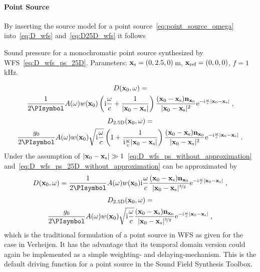 \paragraph{Point Source}
%
%
By inserting the source model for a point
source~\eqref{eq:point_source_omega}
into~\eqref{eq:D_wfs} and~\eqref{eq:D25D_wfs} it follows
%
\begin{marginfigure}
    \centering
    \ft
    
    \caption{Sound pressure for a monochromatic point source synthesized by
        \twohalfD \ac{WFS}~\eqref{eq:D_wfs_ps_25D}. Parameters: $\mathbf{x}_\text{s} = (0,2.5,0)$\,m,
        $\mathbf{x}_\text{ref} = (0,0,0)$, $f = 1$\,kHz.
        }
\end{marginfigure}
%
\begin{multline}
    D(\x_0,\omega) = \\
    \frac{1}{2\PI} A(\omega) w(\x_0) \left(\I\omegac +
    \frac{1}{|\x_0-\xs|} \right) \frac{(\x_0-\xs)\n_{\x_0}}{|\x_0-\xs|^2}
    \E^{-\I\omegac |\x_0-\xs|} \qc
    \label{eq:D_wfs_ps_without_approximation}
\end{multline}
%
\begin{multline}
    D_\twohalfD(\x_0,\omega) = \\
    \frac{g_0}{2\PI} A(\omega) w(\x_0) \sqrt{\I\omegac} \left(
    1 + \frac{1}{\I\omegac|\x_0-\xs|}
    \right) \frac{(\x_0-\xs) \n_{\x_0}}{|\x_0-\xs|^2} \E^{-\I\omegac |\x_0-\xs|} \qp
    \label{eq:D_wfs_ps_25D_without_approximation}
\end{multline}
%
Under the assumption of $|\mathbf{x}_0-\mathbf{x}_\text{s}| \gg
1$~\eqref{eq:D_wfs_ps_without_approximation}
and~\eqref{eq:D_wfs_ps_25D_without_approximation} can be approximated by
%
\begin{equation}
    D(\x_0,\omega) = \frac{1}{2\PI} A(\omega) w(\x_0) \I\omegac
    \frac{(\x_0-\xs)\n_{\x_0}}{|\x_0-\xs|^{\nicefrac{3}{2}}}
    \E^{-\I\omegac |\x_0-\xs|} \qc
    \label{eq:D_wfs_ps}
\end{equation}
%
\begin{multline}
    D_\twohalfD(\x_0,\omega) = \\
    \frac{g_0}{2\PI} A(\omega) w(\x_0) \sqrt{\I\omegac}
    \frac{(\x_0-\xs)\n_{\x_0}}{|\x_0-\xs|^{\nicefrac{3}{2}}}
    \E^{-\I\omegac |\x_0-\xs|} \qc
    \label{eq:D_wfs_ps_25D}
\end{multline}
%
which is the traditional formulation of a point source in
\ac{WFS} as given for the \twohalfD case in
Verheijen.\autocite[][(2.22a), whereby $r$ corresponds to $|\x_0-\xs|$ and
$\cos\varphi$ to $\frac{(\x_0-\xs)\n_{\x_0}}{|\x_0-\xs|}$]{Verheijen1997}
It has the advantage that its temporal domain version could again be implemented as
a simple weighting- and delaying-mechanism.
This is the default driving function for a point source in the Sound Field
Synthesis Toolbox.

